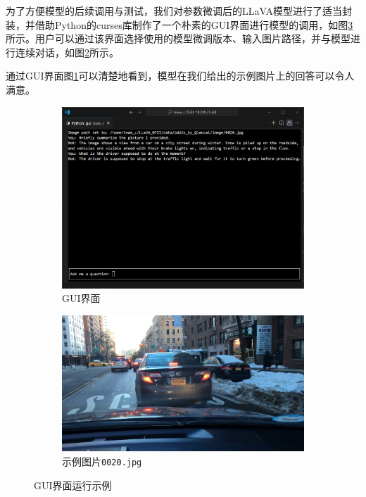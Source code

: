 \documentclass[
    linespread = 1.25
]{ctexart}
\begin{document}
为了方便模型的后续调用与测试，我们对参数微调后的LLaVA模型进行了适当封装，并借助Python的curses库制作了一个朴素的GUI界面进行模型的调用，如图\ref{fig:gui_result}所示。用户可以通过该界面选择使用的模型微调版本、输入图片路径，并与模型进行连续对话，如图\ref{fig:result}所示。

通过GUI界面图\ref{fig:gui}可以清楚地看到，模型在我们给出的示例图片上的回答可以令人满意。
\begin{figure}[htbp]
  \centering
  \begin{subfigure}{0.6\textwidth}
    \centering
    \includegraphics[width=\textwidth]{gui.png}
    \caption{GUI界面}
    \label{fig:gui}
  \end{subfigure}
  \hfill
  \begin{subfigure}{0.36\textwidth}
    \includegraphics[width=\textwidth]{0020.jpg}
    \caption{示例图片\texttt{0020.jpg}}
    \label{fig:result}
  \end{subfigure}
  \caption{GUI界面运行示例}
  \label{fig:gui_result}
\end{figure}
\end{document}
